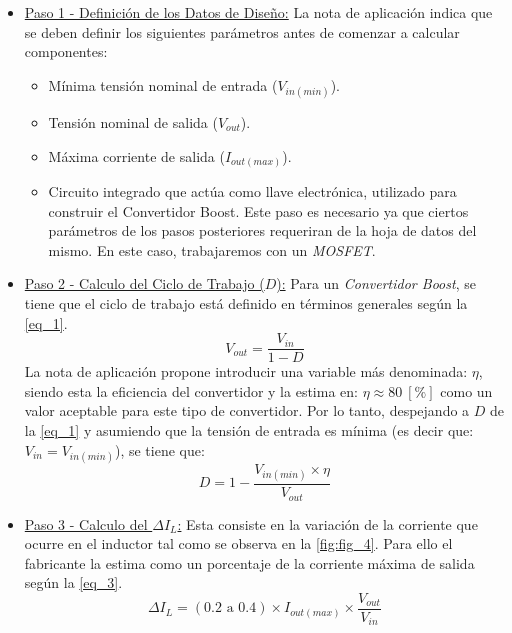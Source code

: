 \documentclass[12pt,a4paper]{article}
\begin{document}
\begin{itemize}
    \item \underline{Paso 1 - Definición de los Datos de Diseño:} La nota de aplicación indica que se deben definir los siguientes parámetros antes de comenzar a calcular componentes:
    \begin{itemize}
        \item Mínima tensión nominal de entrada ($V_{in(min)}$).
        \item Tensión nominal de salida ($V_{out}$).
        \item Máxima corriente de salida ($I_{out(max)}$).
        \item Circuito integrado que actúa como llave electrónica, utilizado para construir el Convertidor Boost. Este paso es necesario ya que ciertos parámetros de los pasos posteriores requeriran de la hoja de datos del mismo. En este caso, trabajaremos con un \textit{MOSFET}.
    \end{itemize}


    \item \underline{Paso 2 - Calculo del Ciclo de Trabajo ($D$):} Para un \textit{Convertidor Boost}, se tiene que el ciclo de trabajo está definido en términos generales según la \autoref{eq_1}.~\cite[págs. 172-178]{b3}
    \begin{equation}
        V_{out} = \frac{V_{in}}{1 - D}
        \label{eq_1}
    \end{equation}
    La nota de aplicación propone introducir una variable más denominada: $\eta$, siendo esta la eficiencia del convertidor y la estima en: $\eta \approx 80 \ [\%]$ como un valor aceptable para este tipo de convertidor. Por lo tanto, despejando a $D$ de la \autoref{eq_1} y asumiendo que la tensión de entrada es mínima (es decir que: $V_{in} = V_{in(min)}$), se tiene que:
    \begin{equation}
        D = 1 - \frac{V_{in(min)} \times \eta}{V_{out}}
        \label{eq_2}
    \end{equation}


    \item \underline{Paso 3 - Calculo del $\Delta I_{L}$:} Esta consiste en la variación de la corriente que ocurre en el inductor tal como se observa en la \autoref{fig:fig_4}. Para ello el fabricante la estima como un porcentaje de la corriente máxima de salida según la \autoref{eq_3}.
    \begin{equation}
        \Delta I_{L} = (0.2 \text{ a } 0.4) \times I_{out(max)} \times \frac{V_{out}}{V_{in}}
        \label{eq_3}
    \end{equation}



\end{itemize}
\end{document}
